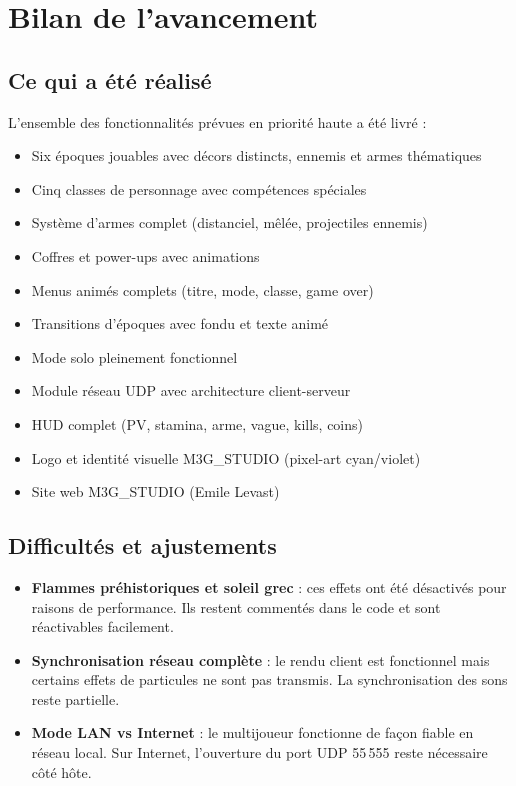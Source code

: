 \documentclass[12pt, a4paper]{report}
\begin{document}
\chapter{Bilan de l'avancement}

\section{Ce qui a \'{e}t\'{e} r\'{e}alis\'{e}}

L'ensemble des fonctionnalit\'{e}s pr\'{e}vues en priorit\'{e} haute a \'{e}t\'{e} livr\'{e} :

\begin{itemize}
  \item[$\checkmark$] Six \'{e}poques jouables avec d\'{e}cors distincts, ennemis et armes th\'{e}matiques
  \item[$\checkmark$] Cinq classes de personnage avec comp\'{e}tences sp\'{e}ciales
  \item[$\checkmark$] Syst\`{e}me d'armes complet (distanciel, m\^{e}l\'{e}e, projectiles ennemis)
  \item[$\checkmark$] Coffres et power-ups avec animations
  \item[$\checkmark$] Menus anim\'{e}s complets (titre, mode, classe, game over)
  \item[$\checkmark$] Transitions d'\'{e}poques avec fondu et texte anim\'{e}
  \item[$\checkmark$] Mode solo pleinement fonctionnel
  \item[$\checkmark$] Module r\'{e}seau UDP avec architecture client-serveur
  \item[$\checkmark$] HUD complet (PV, stamina, arme, vague, kills, coins)
  \item[$\checkmark$] Logo et identit\'{e} visuelle M3G\_STUDIO (pixel-art cyan/violet)
  \item[$\checkmark$] Site web M3G\_STUDIO (Emile Levast)
\end{itemize}

\section{Difficult\'{e}s et ajustements}

\begin{itemize}
  \item \textbf{Flammes pr\'{e}historiques et soleil grec} : ces effets ont \'{e}t\'{e} d\'{e}sactiv\'{e}s pour raisons de performance. Ils restent comment\'{e}s dans le code et sont r\'{e}activables facilement.
  \item \textbf{Synchronisation r\'{e}seau compl\`{e}te} : le rendu client est fonctionnel mais certains effets de particules ne sont pas transmis. La synchronisation des sons reste partielle.
  \item \textbf{Mode LAN vs Internet} : le multijoueur fonctionne de fa\c{c}on fiable en r\'{e}seau local. Sur Internet, l'ouverture du port UDP 55\,555 reste n\'{e}cessaire c\^{o}t\'{e} h\^{o}te.
\end{itemize}
\end{document}

